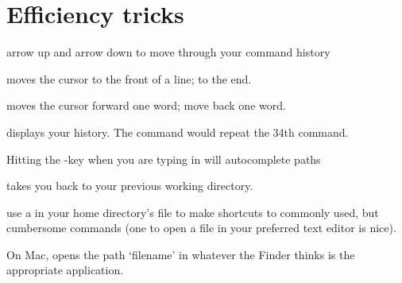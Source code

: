 \documentclass[landscape]{foils}
\begin{document}
\myNewSlide
\textwidth 8in
\oddsidemargin -0.0in

\section*{Efficiency tricks}
\normalsize
\begin{compactenum}
	\item arrow up and arrow down to move through your command history
	\item {} moves the cursor to the front of a line;  to the end.
	\item {} moves the cursor forward one word;  move back one word.
	\item {} displays your history. The command  would repeat the 34th command.
	\item Hitting the -key when you are typing in  will autocomplete paths
	\item {} takes you back to your previous working directory.
	\item use a  in your home directory's  file to make shortcuts to commonly used, but cumbersome commands (one to open a file in your preferred text editor is nice).
	\item On Mac,  opens the path `filename' in whatever the Finder thinks is the appropriate application.
\end{compactenum}
\end{document}
